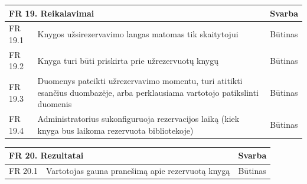 \documentclass{VUMIFPSkursinis}
\begin{document}
 \vspace{5mm}
    \begin{tabular}{ | p{} | p{} | p{} |}
    \hline
     \multicolumn{2}{|l|}{   FR 19. Reikalavimai} &Svarba  \\ \hline 
  FR 19.1 & Knygos užsirezervavimo langas matomas tik skaitytojui & Būtinas \\ \hline
   FR 19.2& Knyga turi būti priskirta prie užrezervuotų knygų &Būtinas\\ \hline
     FR 19.3& Duomenys pateikti užrezervavimo momentu, turi atitikti esančius   duombazėje,
    arba perklausiama vartotojo patikslinti duomenis & Būtinas \\ \hline
    FR 19.4& Administratorius sukonfiguruoja rezervacijos laiką (kiek knyga bus laikoma rezervuota bibliotekoje) & Būtinas \\ \hline
    
   
    \end{tabular}
    \vspace{5mm}
     \begin{tabular}{ | p{} | p{} | p{} |}
    \hline
     \multicolumn{2}{|l|}{ FR 20. Rezultatai } &Svarba  \\ \hline 
  FR 20.1&Vartotojas gauna pranešimą apie rezervuotą knygą& Būtinas\\ \hline

    \end{tabular}
    
 
\end{document}
